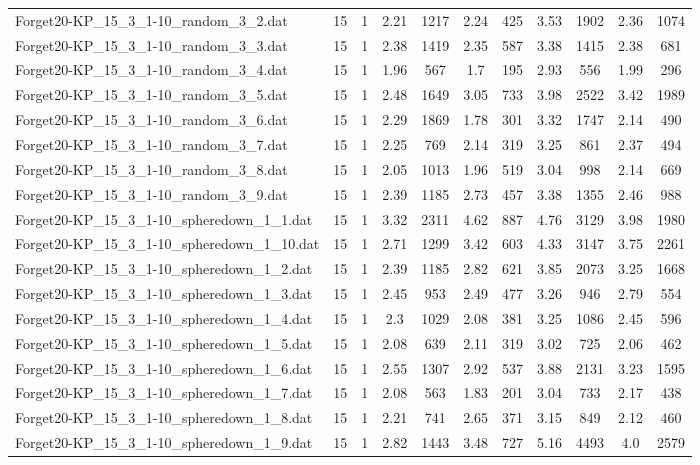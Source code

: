 \begin{table}[!ht]
\begin{tabular}{lcccccccccc}
Forget20-KP\_15\_3\_1-10\_random\_3\_2.dat & 15 & 1 & 2.21 & 1217 & 2.24 & 425 & 3.53 & 1902 & 2.36 & 1074 \\
Forget20-KP\_15\_3\_1-10\_random\_3\_3.dat & 15 & 1 & 2.38 & 1419 & 2.35 & 587 & 3.38 & 1415 & 2.38 & 681 \\
Forget20-KP\_15\_3\_1-10\_random\_3\_4.dat & 15 & 1 & 1.96 & 567 & 1.7 & 195 & 2.93 & 556 & 1.99 & 296 \\
Forget20-KP\_15\_3\_1-10\_random\_3\_5.dat & 15 & 1 & 2.48 & 1649 & 3.05 & 733 & 3.98 & 2522 & 3.42 & 1989 \\
Forget20-KP\_15\_3\_1-10\_random\_3\_6.dat & 15 & 1 & 2.29 & 1869 & 1.78 & 301 & 3.32 & 1747 & 2.14 & 490 \\
Forget20-KP\_15\_3\_1-10\_random\_3\_7.dat & 15 & 1 & 2.25 & 769 & 2.14 & 319 & 3.25 & 861 & 2.37 & 494 \\
Forget20-KP\_15\_3\_1-10\_random\_3\_8.dat & 15 & 1 & 2.05 & 1013 & 1.96 & 519 & 3.04 & 998 & 2.14 & 669 \\
Forget20-KP\_15\_3\_1-10\_random\_3\_9.dat & 15 & 1 & 2.39 & 1185 & 2.73 & 457 & 3.38 & 1355 & 2.46 & 988 \\
Forget20-KP\_15\_3\_1-10\_spheredown\_1\_1.dat & 15 & 1 & 3.32 & 2311 & 4.62 & 887 & 4.76 & 3129 & 3.98 & 1980 \\
Forget20-KP\_15\_3\_1-10\_spheredown\_1\_10.dat & 15 & 1 & 2.71 & 1299 & 3.42 & 603 & 4.33 & 3147 & 3.75 & 2261 \\
Forget20-KP\_15\_3\_1-10\_spheredown\_1\_2.dat & 15 & 1 & 2.39 & 1185 & 2.82 & 621 & 3.85 & 2073 & 3.25 & 1668 \\
Forget20-KP\_15\_3\_1-10\_spheredown\_1\_3.dat & 15 & 1 & 2.45 & 953 & 2.49 & 477 & 3.26 & 946 & 2.79 & 554 \\
Forget20-KP\_15\_3\_1-10\_spheredown\_1\_4.dat & 15 & 1 & 2.3 & 1029 & 2.08 & 381 & 3.25 & 1086 & 2.45 & 596 \\
Forget20-KP\_15\_3\_1-10\_spheredown\_1\_5.dat & 15 & 1 & 2.08 & 639 & 2.11 & 319 & 3.02 & 725 & 2.06 & 462 \\
Forget20-KP\_15\_3\_1-10\_spheredown\_1\_6.dat & 15 & 1 & 2.55 & 1307 & 2.92 & 537 & 3.88 & 2131 & 3.23 & 1595 \\
Forget20-KP\_15\_3\_1-10\_spheredown\_1\_7.dat & 15 & 1 & 2.08 & 563 & 1.83 & 201 & 3.04 & 733 & 2.17 & 438 \\
Forget20-KP\_15\_3\_1-10\_spheredown\_1\_8.dat & 15 & 1 & 2.21 & 741 & 2.65 & 371 & 3.15 & 849 & 2.12 & 460 \\
Forget20-KP\_15\_3\_1-10\_spheredown\_1\_9.dat & 15 & 1 & 2.82 & 1443 & 3.48 & 727 & 5.16 & 4493 & 4.0 & 2579 \\

\end{tabular}
\end{table}
